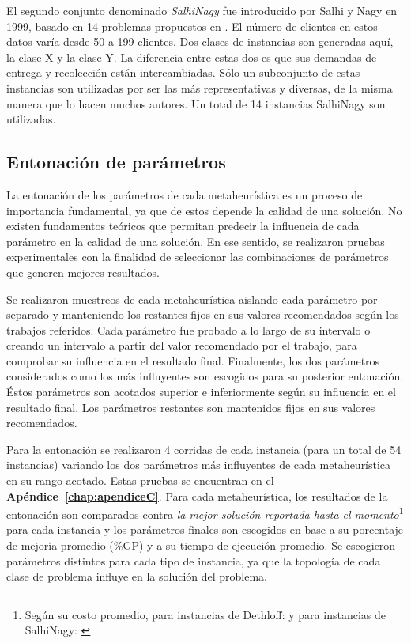 El segundo conjunto denominado \emph{SalhiNagy} fue introducido por Salhi y Nagy \cite{SalhiNagy} en 1999, basado en 14 problemas propuestos en \cite{Christofides}. El número de clientes en estos datos varía desde 50 a 199 clientes. Dos clases de instancias son generadas aquí, la clase X y la clase Y. La diferencia entre estas dos es que sus demandas de entrega y recolección están intercambiadas. Sólo un subconjunto de estas instancias son utilizadas por ser las más representativas y diversas, de la misma manera que lo hacen muchos autores. Un total de 14 instancias SalhiNagy son utilizadas.

\subsection{Entonación de parámetros}\label{subsect:entonacion}

La entonación de los parámetros de cada metaheurística es un proceso de importancia fundamental, ya que de estos depende la calidad de una solución. No existen fundamentos teóricos que permitan predecir la influencia de cada parámetro en la calidad de una solución. En ese sentido, se realizaron pruebas experimentales con la finalidad de seleccionar las combinaciones de parámetros que generen mejores resultados.

Se realizaron muestreos de cada metaheurística aislando cada parámetro por separado y manteniendo los restantes fijos en sus valores recomendados según los trabajos referidos. Cada parámetro fue probado a lo largo de su intervalo o creando un intervalo a partir del valor recomendado por el trabajo, para comprobar su influencia en el resultado final. Finalmente, los dos parámetros considerados como los más influyentes son escogidos para su posterior entonación. Éstos parámetros son acotados superior e inferiormente según su influencia en el resultado final. Los parámetros restantes son mantenidos fijos en sus valores recomendados.

Para la entonación se realizaron 4 corridas de cada instancia (para un total de 54 instancias) variando los dos parámetros más influyentes de cada metaheurística en su rango acotado. Estas pruebas se encuentran en el \textbf{Apéndice~\ref{chap:apendiceC}}. Para cada metaheurística, los resultados de la entonación son comparados contra \emph{la mejor solución reportada hasta el momento}\footnote{Según su costo promedio, para instancias de Dethloff: \cite{ils-vnd} y para instancias de SalhiNagy: \cite{gts}} para cada instancia y los parámetros finales son escogidos en base a su porcentaje de mejoría promedio (\%GP) y a su tiempo de ejecución promedio. Se escogieron parámetros distintos para cada tipo de instancia, ya que la topología de cada clase de problema  influye en la solución del problema.

